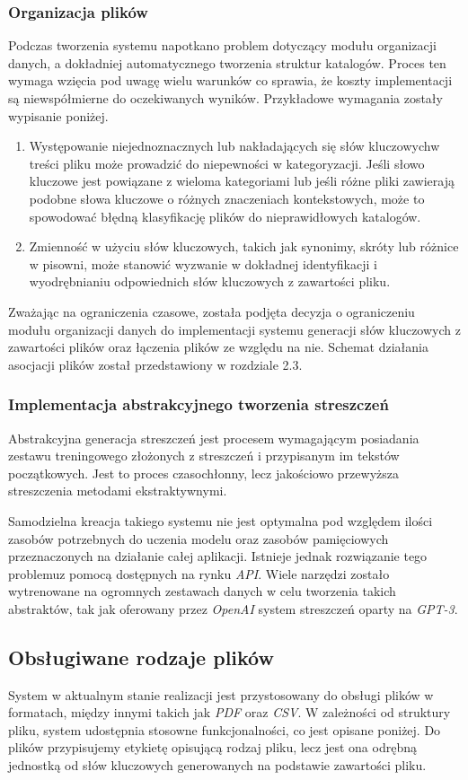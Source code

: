 \documentclass[12pt,a4paper,twoside]{article}
\begin{document}
\subsubsection*{Organizacja plików}
Podczas tworzenia systemu napotkano problem dotyczący modułu organizacji danych, a dokładniej automatycznego tworzenia struktur katalogów. Proces ten wymaga wzięcia pod uwagę wielu warunków co sprawia, że koszty implementacji są niewspółmierne do oczekiwanych wyników. Przykładowe wymagania zostały wypisanie poniżej.
\begin{enumerate}
	\item Występowanie niejednoznacznych lub nakładających się słów kluczowych\break w treści pliku może prowadzić do niepewności w kategoryzacji. Jeśli słowo kluczowe jest powiązane z wieloma kategoriami lub jeśli różne pliki zawierają podobne słowa kluczowe o różnych znaczeniach kontekstowych, może to spowodować błędną klasyfikację plików do nieprawidłowych katalogów.
	\item Zmienność w użyciu słów kluczowych, takich jak synonimy, skróty lub różnice w pisowni, może stanowić wyzwanie w dokładnej identyfikacji i wyodrębnianiu odpowiednich słów kluczowych z zawartości pliku. 
\end{enumerate}
Zważając na ograniczenia czasowe, została podjęta decyzja o ograniczeniu modułu organizacji danych do implementacji systemu generacji słów kluczowych z zawartości plików oraz łączenia plików ze względu na nie. Schemat działania asocjacji plików został przedstawiony w rozdziale 2.3.
\subsubsection*{Implementacja abstrakcyjnego tworzenia streszczeń}
Abstrakcyjna generacja streszczeń jest procesem wymagającym posiadania zestawu treningowego złożonych z streszczeń i przypisanym im tekstów początkowych. Jest to proces czasochłonny, lecz jakościowo przewyższa streszczenia metodami ekstraktywnymi. \par
Samodzielna kreacja takiego systemu nie jest optymalna pod względem ilości zasobów potrzebnych do uczenia modelu oraz zasobów pamięciowych przeznaczonych na działanie całej aplikacji. Istnieje jednak rozwiązanie tego problemu\break z pomocą dostępnych na rynku \textit{API}. Wiele narzędzi zostało wytrenowane na ogromnych zestawach danych w celu tworzenia takich abstraktów, tak jak oferowany przez \textit{OpenAI} system streszczeń oparty na \textit{GPT-3}.
\subsection{Obsługiwane rodzaje plików}
System w aktualnym stanie realizacji jest przystosowany do obsługi plików w formatach, między innymi takich jak \textit{PDF} oraz \textit{CSV}. W zależności od struktury pliku, system udostępnia stosowne funkcjonalności, co jest opisane poniżej. Do plików przypisujemy etykietę opisującą rodzaj pliku, lecz jest ona odrębną jednostką od słów kluczowych generowanych na podstawie zawartości pliku.
\end{document}
